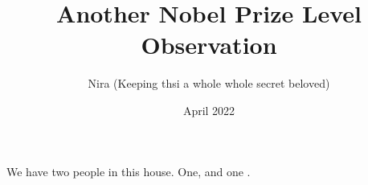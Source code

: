 \documentclass{article}
\title{Another Nobel Prize Level Observation}
\author{Nira (Keeping thsi a whole whole secret beloved)}
\date{April 2022}
\begin{document}
\maketitle
We have two people in this house. One,  and one .
\end{document}
